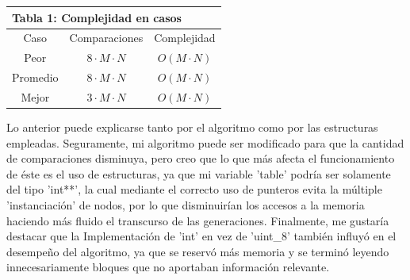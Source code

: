 \documentclass[12pt]{article}
\begin{document}
\begin{center}
    \begin{tabular}{| c | c | c |}
        \multicolumn{3}{l}{Tabla 1: Complejidad en casos} \\
        \hline
        Caso & Comparaciones & Complejidad \\
        \hline
        Peor & $8 \cdot M \cdot N$ & $O(M \cdot N)$ \\
        Promedio & $8 \cdot M \cdot N$ & $O(M \cdot N)$ \\
        Mejor & $3 \cdot M \cdot N$ & $O(M \cdot N)$ \\
        \hline
    \end{tabular}
\end{center}
\vspace{4mm}
\hspace{5mm}
Lo anterior puede explicarse tanto por el algoritmo como por las estructuras empleadas. Seguramente, mi 
algoritmo puede ser modificado para que la cantidad de comparaciones disminuya, pero creo que lo que más 
afecta el funcionamiento de éste es el uso de estructuras, ya que mi variable 'table' podría ser solamente 
del tipo 'int**', la cual mediante el correcto uso de punteros evita la múltiple 'instanciación' de nodos, 
por lo que disminuirían los accesos a la memoria haciendo más fluido el transcurso de las generaciones. 
Finalmente, me gustaría destacar que la Implementación de 'int' en vez de 'uint\_8' también influyó en el 
desempeño del algoritmo, ya que se reservó más memoria y se terminó leyendo innecesariamente bloques que 
no aportaban información relevante.
\end{document}
